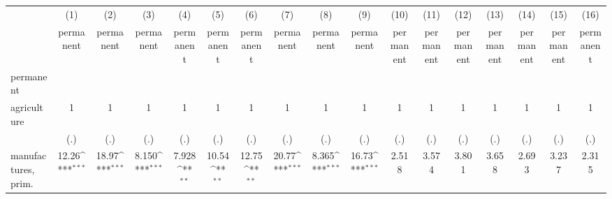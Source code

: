 {
\def\sym#1{\ifmmode^{#1}\else\(^{#1}\)\fi}
\begin{tabular}{l*{16}{c}}
\hline\hline
                    &\multicolumn{1}{c}{(1)}&\multicolumn{1}{c}{(2)}&\multicolumn{1}{c}{(3)}&\multicolumn{1}{c}{(4)}&\multicolumn{1}{c}{(5)}&\multicolumn{1}{c}{(6)}&\multicolumn{1}{c}{(7)}&\multicolumn{1}{c}{(8)}&\multicolumn{1}{c}{(9)}&\multicolumn{1}{c}{(10)}&\multicolumn{1}{c}{(11)}&\multicolumn{1}{c}{(12)}&\multicolumn{1}{c}{(13)}&\multicolumn{1}{c}{(14)}&\multicolumn{1}{c}{(15)}&\multicolumn{1}{c}{(16)}\\
                    &\multicolumn{1}{c}{permanent}&\multicolumn{1}{c}{permanent}&\multicolumn{1}{c}{permanent}&\multicolumn{1}{c}{permanent}&\multicolumn{1}{c}{permanent}&\multicolumn{1}{c}{permanent}&\multicolumn{1}{c}{permanent}&\multicolumn{1}{c}{permanent}&\multicolumn{1}{c}{permanent}&\multicolumn{1}{c}{permanent}&\multicolumn{1}{c}{permanent}&\multicolumn{1}{c}{permanent}&\multicolumn{1}{c}{permanent}&\multicolumn{1}{c}{permanent}&\multicolumn{1}{c}{permanent}&\multicolumn{1}{c}{permanent}\\
\hline
permanent           &                     &                     &                     &                     &                     &                     &                     &                     &                     &                     &                     &                     &                     &                     &                     &                     \\
agriculture         &           1         &           1         &           1         &           1         &           1         &           1         &           1         &           1         &           1         &           1         &           1         &           1         &           1         &           1         &           1         &           1         \\
                    &         (.)         &         (.)         &         (.)         &         (.)         &         (.)         &         (.)         &         (.)         &         (.)         &         (.)         &         (.)         &         (.)         &         (.)         &         (.)         &         (.)         &         (.)         &         (.)         \\
[1em]
manufactures, prim. &       12.26\sym{***}&       18.97\sym{***}&       8.150\sym{***}&       7.928\sym{**} &       10.54\sym{**} &       12.75\sym{**} &       20.77\sym{***}&       8.365\sym{***}&       16.73\sym{***}&       2.518         &       3.574         &       3.801         &       3.658         &       2.693         &       3.237         &       2.315         \\

\end{tabular}}
